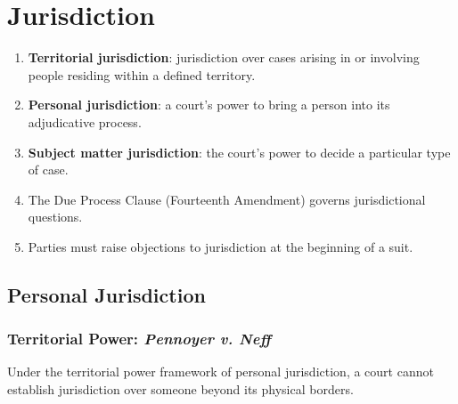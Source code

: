 \section{Jurisdiction}

\begin{enumerate}
    \item \textbf{Territorial jurisdiction}: jurisdiction over cases arising in or 
    involving people residing within a defined territory.
    \item \textbf{Personal jurisdiction}: a court's power to bring a person into its 
    adjudicative process.
    \item \textbf{Subject matter jurisdiction}: the court's power to decide a 
    particular type of case.
    \item The Due Process Clause (Fourteenth Amendment) governs jurisdictional 
    questions.
    \item Parties must raise objections to jurisdiction at the beginning of a suit.
\end{enumerate}

\subsection{Personal Jurisdiction}

\subsubsection{Territorial Power: \emph{Pennoyer v. Neff}}

Under the territorial power framework of personal jurisdiction, a court cannot 
establish jurisdiction over someone beyond its physical borders.

